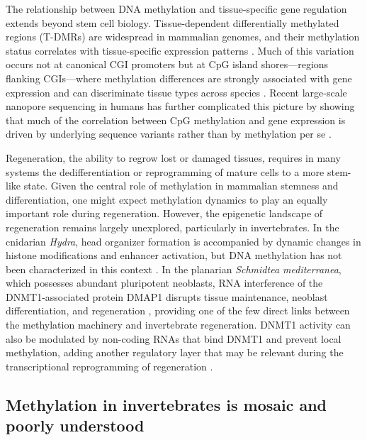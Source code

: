 \documentclass[12pt]{article}
\begin{document}
The relationship between DNA methylation and tissue-specific gene regulation extends beyond stem cell biology. Tissue-dependent differentially methylated regions (T-DMRs) are widespread in mammalian genomes, and their methylation status correlates with tissue-specific expression patterns \cite{songAssociationTissuespecificDifferentially2005, ohganeEpigeneticsDNAMethylation2008}. Much of this variation occurs not at canonical CGI promoters but at CpG island shores---regions flanking CGIs---where methylation differences are strongly associated with gene expression and can discriminate tissue types across species \cite{irizarryHumanColonCancer2009}. Recent large-scale nanopore sequencing in humans has further complicated this picture by showing that much of the correlation between CpG methylation and gene expression is driven by underlying sequence variants rather than by methylation per se \cite{stefanssonCorrelationCpGMethylation2024}.

Regeneration, the ability to regrow lost or damaged tissues, requires in many systems the dedifferentiation or reprogramming of mature cells to a more stem-like state. Given the central role of methylation in mammalian stemness and differentiation, one might expect methylation dynamics to play an equally important role during regeneration. However, the epigenetic landscape of regeneration remains largely unexplored, particularly in invertebrates. In the cnidarian \textit{Hydra}, head organizer formation is accompanied by dynamic changes in histone modifications and enhancer activation, but DNA methylation has not been characterized in this context \cite{reddyEpigenomicLandscapeEnhancer2020}. In the planarian \textit{Schmidtea mediterranea}, which possesses abundant pluripotent neoblasts, RNA interference of the DNMT1-associated protein DMAP1 disrupts tissue maintenance, neoblast differentiation, and regeneration \cite{rojasDNAMethyltransferaseDMAP12024}, providing one of the few direct links between the methylation machinery and invertebrate regeneration. DNMT1 activity can also be modulated by non-coding RNAs that bind DNMT1 and prevent local methylation, adding another regulatory layer that may be relevant during the transcriptional reprogramming of regeneration \cite{diruscioDNMT1interactingRNAsBlock2013}.


\subsection*{Methylation in invertebrates is mosaic and poorly understood}
\end{document}
